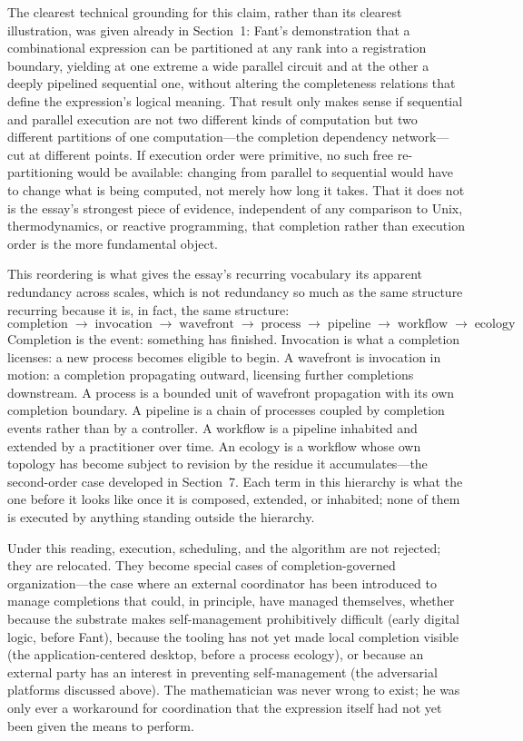 \documentclass[12pt, a4paper]{article}
\begin{document}
The clearest technical grounding for this claim, rather than its
clearest illustration, was given already in Section~1: Fant's
demonstration that a combinational expression can be partitioned
at any rank into a registration boundary, yielding at one extreme
a wide parallel circuit and at the other a deeply pipelined
sequential one, without altering the completeness relations that
define the expression's logical meaning. That result only makes
sense if sequential and parallel execution are not two different
kinds of computation but two different partitions of one
computation---the completion dependency network---cut at
different points. If execution order were primitive, no such
free re-partitioning would be available: changing from parallel
to sequential would have to change what is being computed, not
merely how long it takes. That it does not is the essay's
strongest piece of evidence, independent of any comparison to
Unix, thermodynamics, or reactive programming, that completion
rather than execution order is the more fundamental object.

This reordering is what gives the essay's recurring vocabulary its
apparent redundancy across scales, which is not redundancy so much
as the same structure recurring because it is, in fact, the same
structure:
\[
\text{completion} \;\to\; \text{invocation} \;\to\; \text{wavefront}
\;\to\; \text{process} \;\to\; \text{pipeline} \;\to\; \text{workflow}
\;\to\; \text{ecology}
\]
Completion is the event: something has finished. Invocation is
what a completion licenses: a new process becomes eligible to
begin. A wavefront is invocation in motion: a completion
propagating outward, licensing further completions downstream. A
process is a bounded unit of wavefront propagation with its own
completion boundary. A pipeline is a chain of processes coupled by
completion events rather than by a controller. A workflow is a
pipeline inhabited and extended by a practitioner over time. An
ecology is a workflow whose own topology has become subject to
revision by the residue it accumulates---the second-order case
developed in Section~7. Each term in this hierarchy is what the
one before it looks like once it is composed, extended, or
inhabited; none of them is executed by anything standing outside
the hierarchy.

Under this reading, execution, scheduling, and the algorithm are
not rejected; they are relocated. They become special cases of
completion-governed organization---the case where an external
coordinator has been introduced to manage completions that could,
in principle, have managed themselves, whether because the
substrate makes self-management prohibitively difficult (early
digital logic, before Fant), because the tooling has not yet made
local completion visible (the application-centered desktop, before
a process ecology), or because an external party has an interest
in preventing self-management (the adversarial platforms discussed
above). The mathematician was never wrong to exist; he was only
ever a workaround for coordination that the expression itself had
not yet been given the means to perform.
\end{document}

